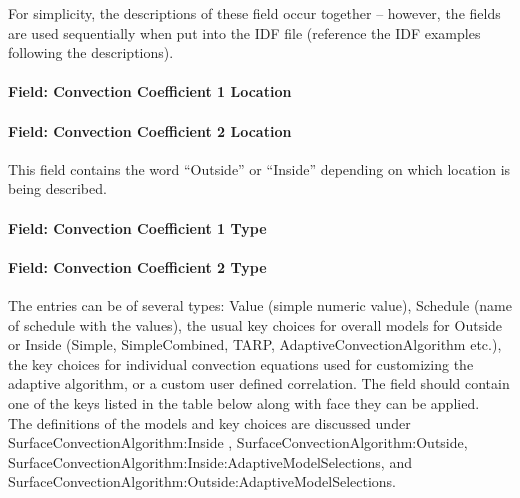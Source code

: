 For simplicity, the descriptions of these field occur together -- however, the fields are used sequentially when put into the IDF file (reference the IDF examples following the descriptions).

\paragraph{Field: Convection Coefficient 1 Location}\label{field-convection-coefficient-1-location-1}

\paragraph{Field: Convection Coefficient 2 Location}\label{field-convection-coefficient-2-location-1}

This field contains the word ``Outside'' or ``Inside'' depending on which location is being described.

\paragraph{Field: Convection Coefficient 1 Type}\label{field-convection-coefficient-1-type-1}

\paragraph{Field: Convection Coefficient 2 Type}\label{field-convection-coefficient-2-type-1}

The entries can be of several types: Value (simple numeric value), Schedule (name of schedule with the values), the usual key choices for overall models for Outside or Inside (Simple, SimpleCombined, TARP, AdaptiveConvectionAlgorithm etc.), the key choices for individual convection equations used for customizing the adaptive algorithm, or a custom user defined correlation. The field should contain one of the keys listed in the table below along with face they can be applied.~ The definitions of the models and key choices are discussed under SurfaceConvectionAlgorithm:Inside , SurfaceConvectionAlgorithm:Outside, SurfaceConvectionAlgorithm:Inside:AdaptiveModelSelections, and SurfaceConvectionAlgorithm:Outside:AdaptiveModelSelections.

